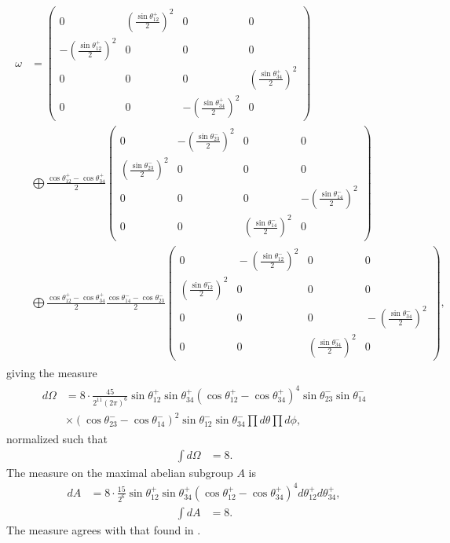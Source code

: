 \begin{align}
\begin{split}
\omega &=
	\begin{pmatrix}
		0 & \left( \frac{\sin\theta^+_{12}}{2}  \right)^2 & 0 & 0 \\
		-\left( \frac{\sin\theta^+_{12}}{2}  \right)^2 & 0 & 0 & 0 \\
		0 & 0 & 0 & \left( \frac{\sin\theta^+_{34}}{2}  \right)^2 \\
		0 & 0 & -\left( \frac{\sin\theta^+_{34}}{2}  \right)^2 & 0
	\end{pmatrix} \\
	&\bigoplus \frac{\cos\theta^+_{12} - \cos\theta^+_{34}}{2}
	\begin{pmatrix}
		0 & -\left( \frac{\sin\theta^-_{23}}{2}  \right)^2 & 0 & 0 \\
		\left( \frac{\sin\theta^-_{23}}{2}  \right)^2 & 0 & 0 & 0 \\
		0 & 0 & 0 & -\left( \frac{\sin\theta^-_{14}}{2}  \right)^2 \\
		0 & 0 & \left( \frac{\sin\theta^-_{14}}{2}  \right)^2 & 0
	\end{pmatrix} \\
	&\bigoplus \frac{\cos\theta^+_{12} - \cos\theta^+_{34}}{2} \frac{\cos\theta^-_{14} - \cos\theta^-_{23}}{2} \!
	\begin{pmatrix}
		0 & \!\!\!\!\!-\left( \frac{\sin\theta^-_{12}}{2}  \right)^2 & 0 & 0 \\
		\left( \frac{\sin\theta^-_{12}}{2}  \right)^2 & 0 & 0 & 0 \\
		0 & 0 & 0 & \!\!\!\!\!-\left( \frac{\sin\theta^-_{34}}{2}  \right)^2 \\
		0 & 0 & \left( \frac{\sin\theta^-_{34}}{2}  \right)^2 & 0
	\end{pmatrix}\!\!,
\end{split}
\end{align}
giving the  measure
\begin{align}\label{measure}
\begin{split}
d\Omega &= 8\cdot \frac{45}{2^{11} (2\pi)^6} \sin \theta_{12}^+ \sin \theta_{34}^+ \left( \cos \theta_{12}^+ - \cos \theta_{34}^+ \right)^4 \sin \theta_{23}^- \sin \theta_{14}^- \\
&\times \left( \cos \theta_{23}^- - \cos \theta_{14}^- \right)^2 \sin \theta_{12}^- \sin \theta_{34}^- \prod d\theta \prod d\phi,
\end{split}
\end{align}
normalized such that
\begin{align}
\int d\Omega &= 8.
\end{align}
The measure on the maximal abelian subgroup $A$ is
\begin{align}
	dA &= 8 \cdot \frac{15}{2^6} \sin \theta_{12}^+ \sin \theta_{34}^+ \left( \cos \theta_{12}^+ - \cos \theta_{34}^+ \right)^4 d\theta_{12}^+ d\theta_{34}^+,
\end{align}
\begin{align}
	\int dA &= 8.
\end{align}
The measure agrees with that found in \cite[\S 17.3.10, p.318]{Vilenkin3}.

